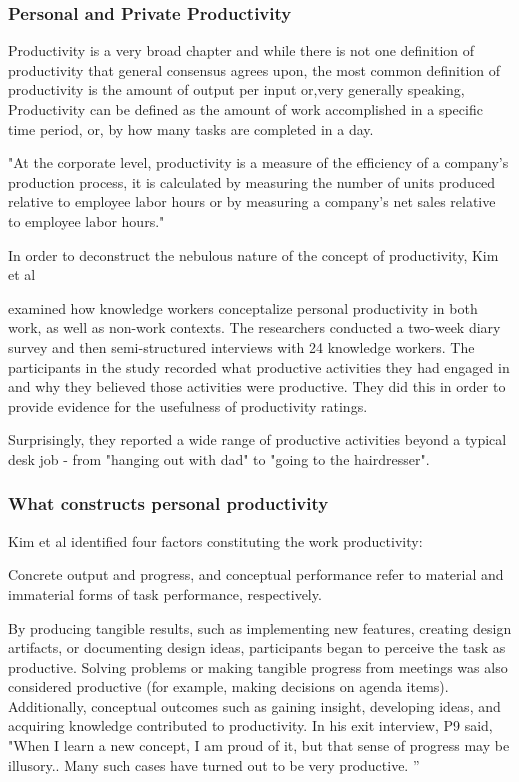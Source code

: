 \subsubsection{Personal and Private Productivity}
Productivity is a very broad chapter and while there is not
one definition of productivity that general consensus agrees upon,
the most common definition of productivity is the amount of
output per input or,very generally speaking, Productivity can be defined as the amount of work
accomplished in a specific time period,
or, by how many tasks are completed in a day.

"At the corporate level, productivity is
a measure of the efficiency of a company's production
process, it is calculated by measuring the number of
units produced relative to employee labor hours or by
measuring a company's net sales relative to employee labor hours."
\cite{Kenton2022Aug}

In order to deconstruct the nebulous nature of the concept of productivity, Kim et al 

\cite{Kim2019May} examined how knowledge workers conceptalize personal productivity in both work, as well as non-work contexts.
The researchers conducted a two-week diary survey and then semi-structured interviews with 24 knowledge workers.
The participants in the study recorded what productive activities they had engaged in and why they believed those activities were productive. They did this in order to provide evidence for the usefulness of productivity ratings.

Surprisingly, they reported a wide range of productive activities beyond a typical desk job - from "hanging out with dad" to "going to the hairdresser".


\subsubsection{What constructs personal productivity}
Kim et al \cite{Kim2019May} identified four factors constituting the work productivity:

Concrete output and progress, and conceptual performance refer to material and immaterial forms of task performance, respectively.

By producing tangible results, such as implementing  new features, creating design artifacts, or documenting  design ideas, participants began to perceive the task as productive. Solving problems or making tangible progress from meetings was also considered productive (for example, making decisions on agenda items). Additionally, conceptual outcomes such as gaining insight, developing ideas, and acquiring knowledge contributed to productivity. In his exit interview, P9 said, "When I learn a new concept, I am proud of it, but that sense of  progress may be illusory.. Many such cases have turned out to be very productive. ”


